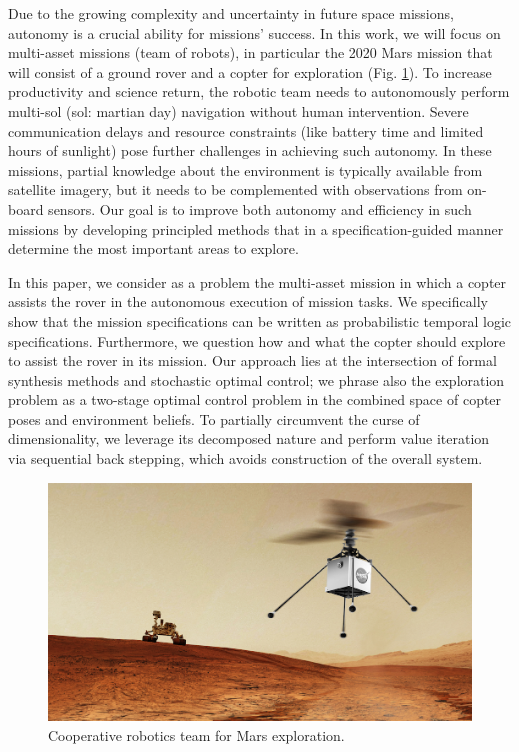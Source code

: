 \documentclass[conference]{IEEEtran}
\newcommand{\sofieNew}[1]{{\color{blue}#1}}
\begin{document}
Due to the growing complexity and uncertainty in future space missions, autonomy is a crucial ability for missions' success. In this work, we will focus on multi-asset missions (team of robots), in particular the 2020 Mars mission that will consist of a ground rover and a copter for exploration (Fig. \ref{fig:heli-rover}). To increase productivity and science return, the robotic team needs to autonomously perform multi-sol (sol: martian day) navigation without human intervention. Severe communication delays and resource constraints (like battery time and limited hours of sunlight) pose further challenges in achieving such autonomy. In these missions, partial knowledge about the environment is typically available from satellite imagery, but it needs to be complemented with observations from on-board sensors. Our goal is to improve both autonomy and efficiency in such missions by developing principled methods that in a specification-guided manner determine the most important areas to explore. 


\sofieNew{In this paper,  we consider as a problem the multi-asset mission in which a copter assists the rover in the autonomous execution of mission tasks.  We specifically show that the mission specifications can be written as probabilistic temporal logic specifications.   Furthermore, we question how and what the copter should explore to assist the rover in its mission.
}
Our approach lies at the intersection of formal synthesis methods and stochastic optimal control; we phrase also the exploration problem as a two-stage optimal control problem in the combined space of copter poses and environment beliefs.  
To partially circumvent the curse of dimensionality, %
we leverage its decomposed nature and perform value iteration via sequential back stepping, which avoids construction of the overall system.
\begin{figure}
  \begin{center}
    \includegraphics[width=0.8\columnwidth]{figs/heli-rover.png}
  \end{center}
  \caption{Cooperative robotics team for Mars exploration.}
  \label{fig:heli-rover}
\end{figure}
\end{document}
